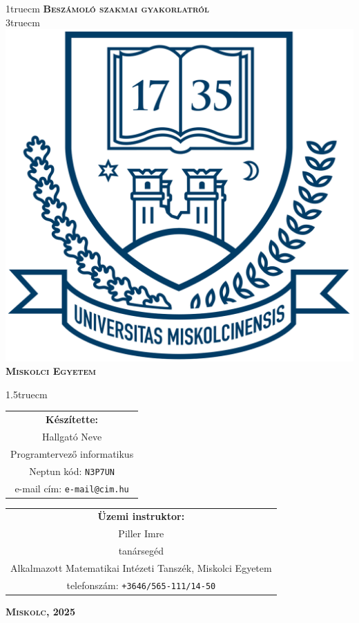 \pagestyle{empty} %

{\large
\begin{center}
\vglue 1truecm
\textbf{\huge\textsc{Beszámoló szakmai gyakorlatról}}\\
\vglue 3truecm
\includegraphics[width=4.8truecm, height=4truecm]{latex/images/me_logo.png}\\
\textbf{\textsc{Miskolci Egyetem}}
\end{center}}

\vglue 1.5truecm %

{\large
\begin{center}
\begin{tabular}{c}
\textbf{Készítette:}\\
Hallgató Neve \\
Programtervező informatikus \\
Neptun kód: \texttt{N3P7UN} \\
e-mail cím: \texttt{e-mail@cim.hu}
\end{tabular}
\end{center}
\vskip 1cm
\begin{center}
\begin{tabular}{c}
\textbf{Üzemi instruktor:}\\
Piller Imre \\
tanársegéd \\
Alkalmazott Matematikai Intézeti Tanszék, Miskolci Egyetem \\
telefonszám: \texttt{+3646/565-111/14-50}


\end{tabular}
\end{center}}
\vfill
{\large
\begin{center}
\textbf{\textsc{Miskolc, 2025}}
\end{center}}

\newpage
